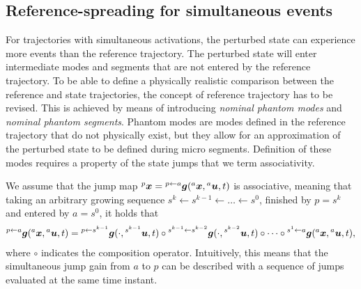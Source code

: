 \documentclass[../DC2017114Bouma.tex]{subfiles}
\begin{document}
\subsection{Reference-spreading for simultaneous events}
For trajectories with simultaneous activations, the perturbed state can experience more events than the reference trajectory. The perturbed state will enter intermediate modes and segments that are not entered by the reference trajectory. To be able to define a physically realistic comparison between the reference and state trajectories, the concept of reference trajectory has to be revised. This is achieved by means of introducing \textit{nominal phantom modes} and \textit{nominal phantom segments}. Phantom modes are modes defined in the reference trajectory that do not physically exist, but they allow for an approximation of the perturbed state to be defined during micro segments. Definition of these modes requires a property of the state jumps that we term associativity.

\begin{sloppypar}
\begin{myass}\label{ass:associativity}
We assume that the jump map $\hspace{0cm}^{p}{\boldsymbol{x}} = \hspace{0cm}^{p\leftarrow a}{\boldsymbol{g}}(\hspace{0cm}^{a}{\boldsymbol{x}},\hspace{0cm}^{a}{\boldsymbol{u}},t)$ is associative, meaning that taking an arbitrary growing sequence $s^k\leftarrow s^{k-1} \leftarrow \dots \leftarrow s^0$, finished by $p = s^k$ and entered by $a = s^0$, it holds that
\begin{align}
\hspace{0cm}^{p\leftarrow a}{\boldsymbol{g}}(\hspace{0cm}^{a}{\boldsymbol{x}},\hspace{0cm}^{a}{\boldsymbol{u}},t) = \hspace{0cm}^{p\leftarrow s^{k-1}}{\boldsymbol{g}}(\cdot,\hspace{0cm}^{s^{k-1}}{\boldsymbol{u}},t) \circ \hspace{0cm}^{s^{k-1} \leftarrow s^{k-2}}{\boldsymbol{g}}(\cdot,\hspace{0cm}^{s^{k-2}}{\boldsymbol{u}},t) \circ \cdots \circ \hspace{0cm}^{s^1 \leftarrow a}{\boldsymbol{g}}(\hspace{0cm}^{a}{\boldsymbol{x}},\hspace{0cm}^{a}{\boldsymbol{u}},t),
\end{align}
where $\circ$ indicates the composition operator. Intuitively, this means that the simultaneous jump gain from $a$ to $p$ can be described with a sequence of jumps evaluated at the same time instant.
\end{myass}
\end{sloppypar}
\end{document}

